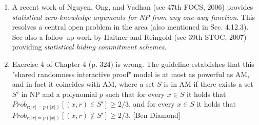 \documentclass[10pt,a4paper]{article}
\begin{document}
\begin{enumerate}
	\item A recent work of Nguyen, Ong, and Vadhan (see 47th FOCS, 2006) provides \textit{statistical zero-knowledge arguments for NP from any one-way function}. This resolves a central open problem in the area (also mentioned in Sec. 4.12.3). See also a follow-up work by Haitner and Reingold (see 39th STOC, 2007) providing \textit{statistical hiding commitment schemes}.
	\item Exercise 4 of Chapter 4 (p. 324) is wrong. The guideline establishes that this "shared randomness interactive proof" model is at most as powerful as AM, and in fact it coincides with AM, where a set $S$ is in AM if there exists a set $S'$ in NP and a polynomial $p$ such that for every $x\in S$ it holds that $Prob_{r:|r|=p(|x|)}[(x,r)\in S'] \geq 2/3$, and for every $x\in S$ it holds that $Prob_{r:|r|=p(|x|)}[(x,r)\not\in S'] \geq 2/3$. [Ben Diamond]
\end{enumerate}
\end{document}

